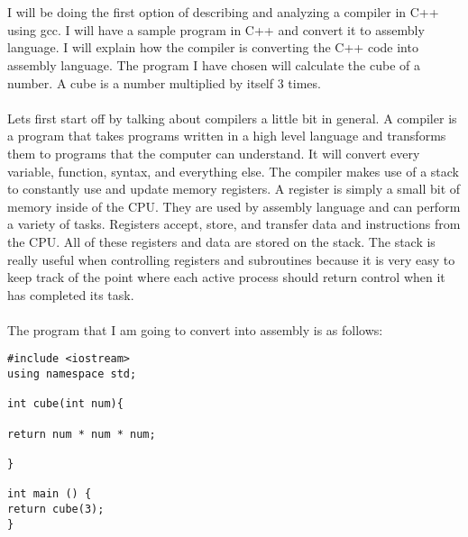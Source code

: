 \documentclass{article}
\theoremstyle{theorem}
\theoremstyle{definition}
\theoremstyle{remark}
\begin{document}

\\
\\


I will be doing the first option of describing and analyzing a compiler in C++ using gcc. I will have a sample program in C++ and convert it to assembly language. I will explain how the compiler is converting the C++ code into assembly language. The program I have chosen will calculate the cube of a number. A cube is a number multiplied by itself 3 times.
\\
\\
Lets first start off by talking about compilers a little bit in general. A compiler is a program that takes programs written in a high level language and transforms them to programs that the computer can understand. It will convert every variable, function, syntax, and everything else. The compiler makes use of a stack to constantly use and update memory registers. A register is simply a small bit of memory inside of the CPU. They are used by assembly language and can perform a variety of tasks. Registers accept, store, and transfer data and instructions from the CPU. All of these registers and data are stored on the stack. The stack is really useful when controlling registers and subroutines because it is very easy to keep track of the point where each active process should return control when it has completed its task.
\\
\\
The program that I am going to convert into assembly is as follows:







\lstset{language = C++}
\begin{lstlisting}
#include <iostream>
using namespace std;

int cube(int num){

return num * num * num;

}

int main () {
return cube(3);
}


\end{lstlisting}
\end{document}
